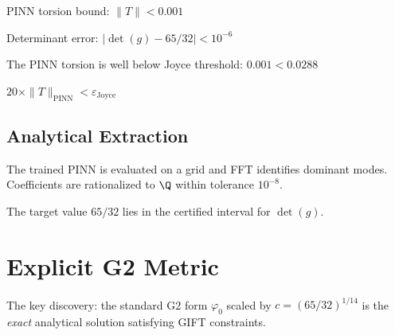 \begin{definition}\label{def:torsion_bound}
    PINN torsion bound: $\|T\| < 0.001$
\end{definition}

\begin{definition}\label{def:det_error}
    Determinant error: $|\det(g) - 65/32| < 10^{-6}$
\end{definition}

\begin{theorem}\label{thm:joyce_satisfied}
    The PINN torsion is well below Joyce threshold: $0.001 < 0.0288$
\end{theorem}

\begin{theorem}[20x Margin]\label{thm:margin_20x}
    $20 \times \|T\|_{\text{PINN}} < \varepsilon_{\text{Joyce}}$
\end{theorem}

\section{Analytical Extraction}

\begin{definition}\label{def:fourier_coeffs}
    The trained PINN is evaluated on a grid and FFT identifies dominant modes.
    Coefficients are rationalized to $\Q$ within tolerance $10^{-8}$.
\end{definition}

\begin{theorem}\label{thm:target_interval}
    The target value $65/32$ lies in the certified interval for $\det(g)$.
\end{theorem}

\chapter{Explicit G2 Metric}\label{chap:explicit_metric}

The key discovery: the standard G2 form $\varphi_0$ scaled by $c = (65/32)^{1/14}$
is the \emph{exact} analytical solution satisfying GIFT constraints.

